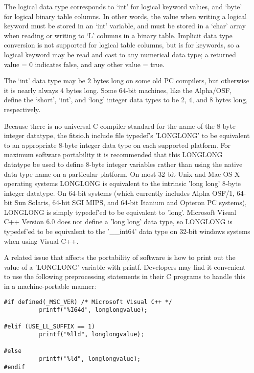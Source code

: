 \documentclass[11pt]{book}
\begin{document}
The logical data type corresponds to `int' for logical keyword values,
and `byte' for logical binary table columns.  In other words, the value
when writing a logical keyword must be stored in an `int' variable, and
must be stored in a `char' array when reading or writing to `L' columns
in a binary table.  Implicit data type conversion is not supported for
logical table columns, but is for keywords, so a logical keyword may be
read and cast to any numerical data type; a returned value = 0
indicates false, and any other value = true.

The `int' data type may be 2 bytes long on some old PC compilers,
but otherwise it is nearly always 4 bytes long.   Some 64-bit
machines, like the Alpha/OSF, define the `short', `int',
and `long' integer data types to be 2, 4, and 8 bytes long,
respectively.

Because there is no universal C compiler standard for the name of the
8-byte integer datatype, the fitsio.h include file typedef's
'LONGLONG'  to be equivalent to  an
appropriate 8-byte integer data type on each supported platform.
For maximum software portability it is recommended that
this LONGLONG datatype be used to define 8-byte integer variables
rather than using the native data type name on a particular
platform. On most
32-bit Unix and Mac OS-X operating systems LONGLONG is equivalent to the
intrinsic 'long long' 8-byte integer datatype.  On 64-bit systems (which currently
includes Alpha OSF/1, 64-bit Sun Solaris, 64-bit SGI MIPS, and  64-bit
Itanium and Opteron PC systems), LONGLONG is  simply typedef'ed to be
equivalent to 'long'.   Microsoft Visual C++ Version 6.0 does not define
a 'long long'  data type, so LONGLONG is typedef'ed to be equivalent to
the '\_\_int64' data type on 32-bit windows systems when using Visual C++.

A related issue that affects the portability of software is how to print
out the value of a 'LONGLONG' variable with printf.  Developers may
find it convenient to use the following preprocessing statements
in their C programs to handle this in a machine-portable manner:


\begin{verbatim}
#if defined(_MSC_VER) /* Microsoft Visual C++ */
          printf("%I64d", longlongvalue);
	
#elif (USE_LL_SUFFIX == 1)
          printf("%lld", longlongvalue);
	
#else
          printf("%ld", longlongvalue);
#endif
\end{verbatim}
\end{document}
